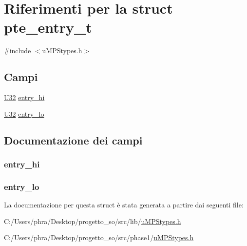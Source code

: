 \hypertarget{structpte__entry__t}{\section{Riferimenti per la struct pte\-\_\-entry\-\_\-t}
\label{structpte__entry__t}
}


{\ttfamily \#include $<$u\-M\-P\-Stypes.\-h$>$}

\subsection*{Campi}
\begin{DoxyCompactItemize}
\item 
\hyperlink{lib_2base_8h_ac3df7cf3c8cb172a588adec881447d68}{U32} \hyperlink{structpte__entry__t_a867e8a3789b0868e6fe3cb734b8d7e34}{entry\-\_\-hi}
\item 
\hyperlink{lib_2base_8h_ac3df7cf3c8cb172a588adec881447d68}{U32} \hyperlink{structpte__entry__t_afe028ede8677834da78a88fb7257be4e}{entry\-\_\-lo}
\end{DoxyCompactItemize}


\subsection{Documentazione dei campi}
\hypertarget{structpte__entry__t_a867e8a3789b0868e6fe3cb734b8d7e34}{
\subsubsection[{entry\-\_\-hi}]{ entry\-\_\-hi}}\label{structpte__entry__t_a867e8a3789b0868e6fe3cb734b8d7e34}
\hypertarget{structpte__entry__t_afe028ede8677834da78a88fb7257be4e}{
\subsubsection[{entry\-\_\-lo}]{ entry\-\_\-lo}}\label{structpte__entry__t_afe028ede8677834da78a88fb7257be4e}


La documentazione per questa struct è stata generata a partire dai seguenti file\-:\begin{DoxyCompactItemize}
\item 
C\-:/\-Users/phra/\-Desktop/progetto\-\_\-so/src/lib/\hyperlink{lib_2u_m_p_stypes_8h}{u\-M\-P\-Stypes.\-h}\item 
C\-:/\-Users/phra/\-Desktop/progetto\-\_\-so/src/phase1/\hyperlink{phase1_2u_m_p_stypes_8h}{u\-M\-P\-Stypes.\-h}\end{DoxyCompactItemize}
